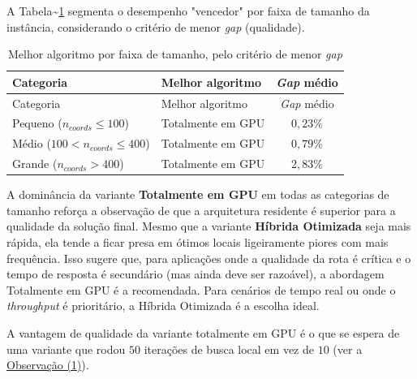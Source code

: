 A Tabela\textasciitilde{}\ref{tbl:best-algorithm} segmenta o desempenho "vencedor" por faixa de tamanho da instância, considerando o critério de menor \emph{gap} (qualidade).

\begin{longtable}[]{@{}llc@{}}
  \caption{Melhor algoritmo por faixa de tamanho, pelo critério de menor \emph{gap}
    \label{tbl:best-algorithm}} \\
  \toprule
  Categoria                            & Melhor algoritmo  & \emph{Gap} médio      \\
  \midrule
  \endfirsthead
  \toprule
  Categoria                            & Melhor algoritmo  & \emph{Gap} médio      \\
  \midrule
  \endhead
  \bottomrule
  \endlastfoot
  Pequeno (\(n_{coords} \le 100\))     & Totalmente em GPU & \(0{,}23\%\)          \\
  Médio (\(100 < n_{coords} \le 400\)) & Totalmente em GPU & \(0{,}79\%\)          \\
  Grande (\(n_{coords} > 400\))        & Totalmente em GPU & \(2{,}83\%\)          \\
\end{longtable}

A dominância da variante \textbf{Totalmente em GPU} em todas as categorias de tamanho reforça a observação de que a arquitetura residente é superior para a qualidade da solução final.
Mesmo que a variante \textbf{Híbrida Otimizada} seja mais rápida, ela tende a ficar presa em ótimos locais ligeiramente piores com mais frequência.
Isso sugere que, para aplicações onde a qualidade da rota é crítica e o tempo de resposta é secundário (mas ainda deve ser razoável), a abordagem Totalmente em GPU é a recomendada.
Para cenários de tempo real ou onde o \emph{throughput} é prioritário, a Híbrida Otimizada é a escolha ideal.

\begin{warning}\label{obs-erro-iteracoes}
  A vantagem de qualidade da variante totalmente em GPU é o que se espera de uma variante que rodou \(50\) iterações de busca local em vez de \(10\) (ver a \hyperref[obs-fullgpu-iteracoes]{Observação (1)}).
\end{warning}


